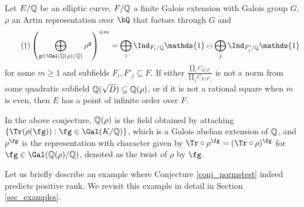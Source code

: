 \begin{conj}\cite[Theorem 33]{DEW1}\label{conj_normstest}
    Let $E/\mathbb{Q}$ be an elliptic curve, $F/\mathbb{Q}$ a finite Galois extension with Galois group $G$, $\rho$ an Artin representation over $\bQ$ that factors through $G$ and 
    \begin{equation}\label{eqn_localterms}\tag{\textdagger}
        \left(\bigoplus_{\mathfrak{g}\in\Gal(\QQ(\rho)/\QQ)}\rho^{\mathfrak{g}}\right)^{\oplus m}=\bigoplus_i\Ind_{F_i/\QQ}\mathds{1}\ominus\bigoplus_j\Ind_{F'_j/\QQ}\mathds{1}
    \end{equation}
    for some $m\geq 1$ and subfields $F_i,F'_j\subseteq F$. If either $\frac{\prod_i C_{E/F_i}}{\prod_j C_{E/F'_j}}$ is not a norm from some quadratic subfield $\mathbb{Q}(\sqrt{D})\subseteq\mathbb{Q}(\rho)$, or if it is not a rational square when $m$ is even, then $E$ has a point of infinite order over $F$.
\end{conj}

In the above conjecture, $\mathbb{Q}(\rho)$ is the field obtained by attaching $\{\Tr(\rho(\fg)):\fg\in\Gal(K/\QQ)\}$, which is a Galois abelian extension of $\mathbb{Q}$, and $\rho^{\fg}$ is the representation with character given by $\Tr\circ\rho^{\fg}=(\Tr\circ\rho)^{\fg}$ for $\fg\in\Gal(\QQ(\rho)/\QQ)$, denoted as the twist of $\rho$ by $\fg$.


Let us briefly describe an example where Conjecture \ref{conj_normstest} indeed predicts positive rank. We revisit this example in detail in Section \ref{sec_examples}.

